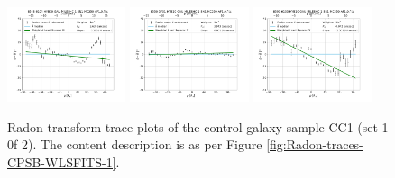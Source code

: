 \begin{figure}
    \includegraphics[width=0.31\textwidth]{Images/WLSFITS/CC1/8548-6104.png}
    \includegraphics[width=0.31\textwidth]{Images/WLSFITS/CC1/8550-3701.png}
    \includegraphics[width=0.31\textwidth]{Images/WLSFITS/CC1/8591-6103.png}
%
    \caption{Radon transform trace plots of the control galaxy sample CC1 (set 1 0f 2). The content description is as per Figure \ref{fig:Radon-traces-CPSB-WLSFITS-1}.}
    \label{fig:Radon-traces-CC1-WLSFITS-1}
\end{figure}

